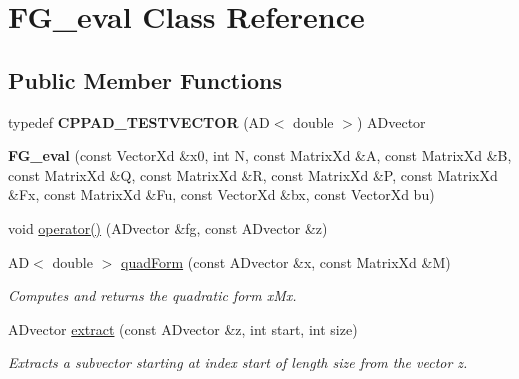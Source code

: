 \hypertarget{classFG__eval}{}\section{F\+G\+\_\+eval Class Reference}
\label{classFG__eval}
\subsection*{Public Member Functions}
\begin{DoxyCompactItemize}
\item 
\mbox{\label{classFG__eval_aa996df77a971dedd5d5715ef6be1258e}} 
typedef {\bfseries C\+P\+P\+A\+D\+\_\+\+T\+E\+S\+T\+V\+E\+C\+T\+OR} (AD$<$ double $>$) A\+Dvector
\item 
\mbox{\label{classFG__eval_a21207506da5c8dd16a9cde39c899fdac}} 
{\bfseries F\+G\+\_\+eval} (const Vector\+Xd \&x0, int N, const Matrix\+Xd \&A, const Matrix\+Xd \&B, const Matrix\+Xd \&Q, const Matrix\+Xd \&R, const Matrix\+Xd \&P, const Matrix\+Xd \&Fx, const Matrix\+Xd \&Fu, const Vector\+Xd \&bx, const Vector\+Xd bu)
\item 
void \mbox{\hyperlink{classFG__eval_a43a1e90f9d5b9729c3c3f2d4b83c2abe}{operator()}} (A\+Dvector \&fg, const A\+Dvector \&z)
\item 
\mbox{\label{classFG__eval_a80dd9281eb5fec75b488b8d19439c836}} 
AD$<$ double $>$ \mbox{\hyperlink{classFG__eval_a80dd9281eb5fec75b488b8d19439c836}{quad\+Form}} (const A\+Dvector \&x, const Matrix\+Xd \&M)
\begin{DoxyCompactList}\small\item\em Computes and returns the quadratic form x\textquotesingle{}Mx. \end{DoxyCompactList}\item 
\mbox{\label{classFG__eval_a5ee812f6d393850b3f8c702b60c35ad7}} 
A\+Dvector \mbox{\hyperlink{classFG__eval_a5ee812f6d393850b3f8c702b60c35ad7}{extract}} (const A\+Dvector \&z, int start, int size)
\begin{DoxyCompactList}\small\item\em Extracts a subvector starting at index start of length size from the vector z. \end{DoxyCompactList}\item 
\mbox{\label{classFG__eval_a3938a02d039cc343f88a444d13289cc1}} 

\end{DoxyCompactItemize}
